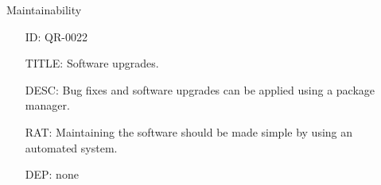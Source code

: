         Maintainability

        \begin{itemize}
          \setlength{\itemindent}{.5in}
          \itemsep .15em
          \item[ID:] QR-0022
          \item[TITLE:] Software upgrades.
          \item[DESC:] Bug fixes and software upgrades can be applied using a
            package manager.
          \item[RAT:] Maintaining the software should be made simple by using
            an automated system.
          \item[DEP:] none
        \end{itemize}









